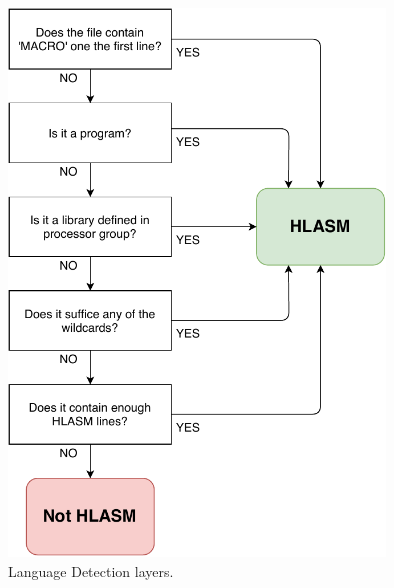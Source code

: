 \begin{figure}
	\centering
	\includegraphics[width=10cm]{img/lang_detection}
	\caption{Language Detection layers.}
	
	\label{fig08:lang}
\end{figure}

